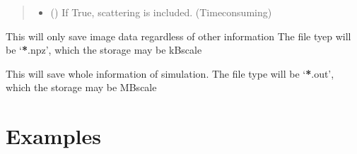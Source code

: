 \documentclass[a4paper,11pt,english]{sphinxmanual}
\begin{document}
\begin{fulllineitems}
\begin{fulllineitems}
\begin{quote}
\begin{description}
\begin{itemize}
\item {} 
\sphinxAtStartPar
{} () \textendash{} If True, scattering is included. (Time\sphinxhyphen{}consuming)

\end{itemize}

\end{description}\end{quote}

\end{fulllineitems}


\begin{fulllineitems}
\label{\detokenize{radmc3d:simulate.generate_simulation.save_npzfile}}
\pysigstartsignatures
\pysiglinewithargsret
{}
{\sphinxparamcomma {}\sphinxparamcomma {}\sphinxparamcomma {}}
{}
\pysigstopsignatures
\sphinxAtStartPar
This will only save image data regardless of other information
The file tyep will be ‘{\color{red}\bfseries{}*}.npz’, which the storage may be kB\sphinxhyphen{}scale

\end{fulllineitems}


\begin{fulllineitems}
\label{\detokenize{radmc3d:simulate.generate_simulation.save_outfile}}
\pysigstartsignatures
\pysiglinewithargsret
{}
{\sphinxparamcomma {}\sphinxparamcomma {}}
{}
\pysigstopsignatures
\sphinxAtStartPar
This will save whole information of simulation.
The file type will be ‘{\color{red}\bfseries{}*}.out’, which the storage may be MB\sphinxhyphen{}scale

\end{fulllineitems}


\end{fulllineitems}


\sphinxstepscope


\chapter{Examples}
\label{\detokenize{example:examples}}\label{\detokenize{example::doc}}


\renewcommand{\indexname}{Index}
\printindex
\end{document}
